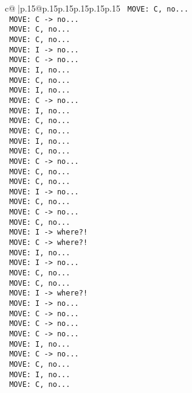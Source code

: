 \documentclass{article}
\begin{document}
{\begin{supertabular}{c@{$\;$}|p{.15\linewidth}@{}p{.15\linewidth}p{.15\linewidth}p{.15\linewidth}p{.15\linewidth}p{.15\linewidth}}
{{{\texttt{ MOVE: C, no...} \\
\texttt{ MOVE: C {-}> no...} \\
\texttt{ MOVE: C, no...} \\
\texttt{ MOVE: C, no...} \\
\texttt{ MOVE: I {-}> no...} \\
\texttt{ MOVE: C {-}> no...} \\
\texttt{ MOVE: I, no...} \\
\texttt{ MOVE: C, no...} \\
\texttt{ MOVE: I, no...} \\
\texttt{ MOVE: C {-}> no...} \\
\texttt{ MOVE: I, no...} \\
\texttt{ MOVE: C, no...} \\
\texttt{ MOVE: C, no...} \\
\texttt{ MOVE: I, no...} \\
\texttt{ MOVE: C, no...} \\
\texttt{ MOVE: C {-}> no...} \\
\texttt{ MOVE: C, no...} \\
\texttt{ MOVE: C, no...} \\
\texttt{ MOVE: I {-}> no...} \\
\texttt{ MOVE: C, no...} \\
\texttt{ MOVE: C {-}> no...} \\
\texttt{ MOVE: C, no...} \\
\texttt{ MOVE: I {-}> where?!} \\
\texttt{ MOVE: C {-}> where?!} \\
\texttt{ MOVE: I, no...} \\
\texttt{ MOVE: I {-}> no...} \\
\texttt{ MOVE: C, no...} \\
\texttt{ MOVE: C, no...} \\
\texttt{ MOVE: I {-}> where?!} \\
\texttt{ MOVE: I {-}> no...} \\
\texttt{ MOVE: C {-}> no...} \\
\texttt{ MOVE: C {-}> no...} \\
\texttt{ MOVE: C {-}> no...} \\
\texttt{ MOVE: I, no...} \\
\texttt{ MOVE: C {-}> no...} \\
\texttt{ MOVE: C, no...} \\
\texttt{ MOVE: I, no...} \\
\texttt{ MOVE: C, no...} \\
}}}
\end{supertabular}}
\end{document}

